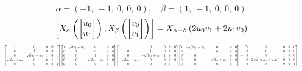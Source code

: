 \documentclass[11pt]{article}
\theoremstyle{definition}
\begin{document}
\[
\alpha = \left( -1, \  -1, \  0, \  0, \  0\right), \quad \beta = \left( 1, \  -1, \  0, \  0, \  0\right)
\]
\[
\scaletoalign{\textwidth}{\left[ X_{\alpha}\left(\left[\begin{matrix}u_{0}\\u_{1}\end{matrix}\right]\right), X_{\beta}\left(\left[\begin{matrix}v_{0}\\v_{1}\end{matrix}\right]\right) \right] = X_{\alpha + \beta}\left(2 u_{0} v_{1} + 2 u_{1} v_{0}\right)}
\]
\[
\scaletoalign{\textwidth}{{\left[\begin{matrix}1 & 0 & 0 & 0 & 0\\0 & 1 & 0 & 0 & 0\\0 & \sqrt{d} u_{1} - u_{0} & 1 & 0 & 0\\\sqrt{d} u_{1} + u_{0} & 0 & 0 & 1 & 0\\0 & 0 & 0 & 0 & 1\end{matrix}\right]} {\left[\begin{matrix}1 & \sqrt{d} v_{1} + v_{0} & 0 & 0 & 0\\0 & 1 & 0 & 0 & 0\\0 & 0 & 1 & 0 & 0\\0 & 0 & \sqrt{d} v_{1} - v_{0} & 1 & 0\\0 & 0 & 0 & 0 & 1\end{matrix}\right]} {\left[\begin{matrix}1 & 0 & 0 & 0 & 0\\0 & 1 & 0 & 0 & 0\\0 & - \sqrt{d} u_{1} + u_{0} & 1 & 0 & 0\\- \sqrt{d} u_{1} - u_{0} & 0 & 0 & 1 & 0\\0 & 0 & 0 & 0 & 1\end{matrix}\right]} {\left[\begin{matrix}1 & - \sqrt{d} v_{1} - v_{0} & 0 & 0 & 0\\0 & 1 & 0 & 0 & 0\\0 & 0 & 1 & 0 & 0\\0 & 0 & - \sqrt{d} v_{1} + v_{0} & 1 & 0\\0 & 0 & 0 & 0 & 1\end{matrix}\right]} = {\left[\begin{matrix}1 & 0 & 0 & 0 & 0\\0 & 1 & 0 & 0 & 0\\0 & 0 & 1 & 0 & 0\\0 & 2 \sqrt{d} \left(u_{0} v_{1} + u_{1} v_{0}\right) & 0 & 1 & 0\\0 & 0 & 0 & 0 & 1\end{matrix}\right]}}
\]
\end{document}
